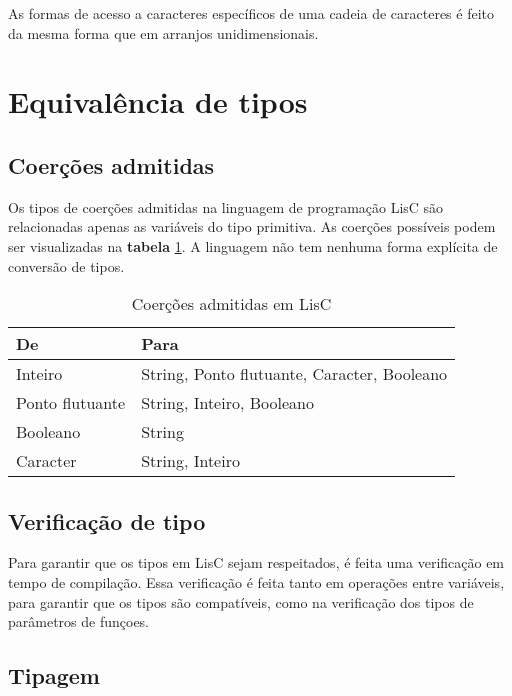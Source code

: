 \documentclass[
  12pt,				%
  oneside,			%
  a4paper,			%
  english,			%
  french,				%
  spanish,			%
  brazil,				%
]{abntex2}
\begin{document}
As formas de acesso a caracteres específicos de uma cadeia de
caracteres é feito da mesma forma que em arranjos unidimensionais.


\section{Equivalência de tipos}
\label{sec:equivalencia-de-tipos}

\subsection{Coerções admitidas}
\label{subsec:coercoes-admitidas}

Os tipos de coerções admitidas na linguagem de programação LisC são
relacionadas apenas as variáveis do tipo primitiva. As coerções
possíveis podem ser visualizadas na \textbf{tabela}
\ref{tab:coercoes}. A linguagem não tem nenhuma forma explícita de
conversão de tipos.

\begin{table}[H]
  \centering
  \caption{Coerções admitidas em LisC}
  \label{tab:coercoes}
  \begin{tabular}{|l|l|}
    \hline
    De & Para \\ \hline
    Inteiro & String, Ponto flutuante, Caracter, Booleano \\ 
    Ponto flutuante & String, Inteiro, Booleano \\     
    Booleano & String \\ 
    Caracter & String, Inteiro \\     \hline
  \end{tabular}
\end{table}

\subsection{Verificação de tipo}
\label{subsec:verificacao-de-tipo}

Para garantir que os tipos em LisC sejam respeitados, é feita uma
verificação em tempo de compilação. Essa verificação é feita tanto em
operações entre variáveis, para garantir que os tipos são compatíveis,
como na verificação dos tipos de parâmetros de funçoes.

\subsection{Tipagem}
\label{subsec:tipagem}
\end{document}
